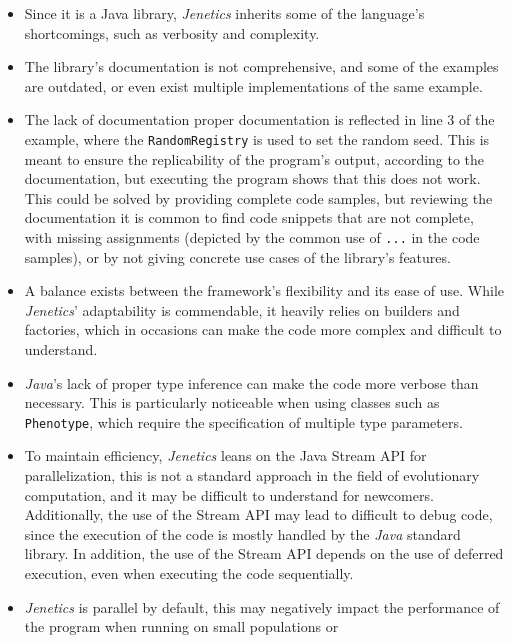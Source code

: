   \begin{itemize}
    \item Since it is a Java library, \textit{Jenetics} inherits some of the
      language's shortcomings, such as verbosity and complexity.
    \item The library's documentation is not comprehensive, and some of the
      examples are outdated, or even exist multiple implementations of the same
      example.
    \item The lack of documentation proper documentation is reflected in line 3
      of the example, where the \texttt{RandomRegistry} is used to set the
      random seed.
      This is meant to ensure the replicability of the program's output, 
      according to the documentation, but executing the program shows that this
      does not work.
      This could be solved by providing complete code samples, but reviewing the
      documentation it is common to find code snippets that are not complete,
      with missing assignments (depicted by the common use of \texttt{...} in 
      the code samples), or by not giving concrete use cases of the library's
      features.
    \item A balance exists between the framework's flexibility and its ease of
      use.
      While \textit{Jenetics}' adaptability is commendable, it heavily relies
      on builders and factories, which in occasions can make the code more
      complex and difficult to understand.
    \item \textit{Java}'s lack of proper type inference can make the code more
      verbose than necessary.
      This is particularly noticeable when using classes such as
      \texttt{Phenotype}, which require the specification of multiple type
      parameters.
    \item To maintain efficiency, \textit{Jenetics} leans on the Java Stream 
      API for parallelization, this is not a standard approach in the field of
      evolutionary computation, and it may be difficult to understand for
      newcomers.
      Additionally, the use of the Stream API may lead to difficult to debug
      code, since the execution of the code is mostly handled by the 
      \textit{Java} standard library.
      In addition, the use of the Stream API depends on the use of deferred
      execution, even when executing the code sequentially.
    \item \textit{Jenetics} is parallel by default, this may negatively impact
      the performance of the program when running on small populations or

\end{itemize}
